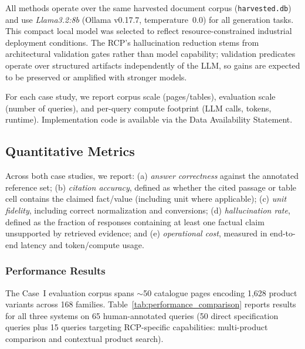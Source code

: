 \documentclass[largeformat]{interact}
\begin{document}
\noindent All methods operate over the same harvested document corpus (\texttt{harvested.db}) and use \emph{Llama3.2:8b} (Ollama v0.17.7, temperature~0.0) for all generation tasks. This compact local model was selected to reflect resource-constrained industrial deployment conditions. The RCP's hallucination reduction stems from architectural validation gates rather than model capability; validation predicates operate over structured artifacts independently of the LLM, so gains are expected to be preserved or amplified with stronger models.

For each case study, we report corpus scale (pages/tables), evaluation scale (number of queries), and per-query compute footprint (LLM calls, tokens, runtime). Implementation code is available via the Data Availability Statement.

\subsection{Quantitative Metrics}
\label{subsec:metrics}
Across both case studies, we report:
(a) \textit{answer correctness} against the annotated reference set;
(b) \textit{citation accuracy}, defined as whether the cited passage or table cell contains the claimed fact/value (including unit where applicable);
(c) \textit{unit fidelity}, including correct normalization and conversions;
(d) \textit{hallucination rate}, defined as the fraction of responses containing at least one factual claim unsupported by retrieved evidence; and
(e) \textit{operational cost}, measured in end-to-end latency and token/compute usage.

\subsubsection{Performance Results}
\label{subsubsec:performance_results}
The Case~I evaluation corpus spans $\sim$50 catalogue pages encoding 1,628 product variants across 168 families. Table~\ref{tab:performance_comparison} reports results for all three systems on 65 human-annotated queries (50 direct specification queries plus 15 queries targeting RCP-specific capabilities: multi-product comparison and contextual product search).
\end{document}
